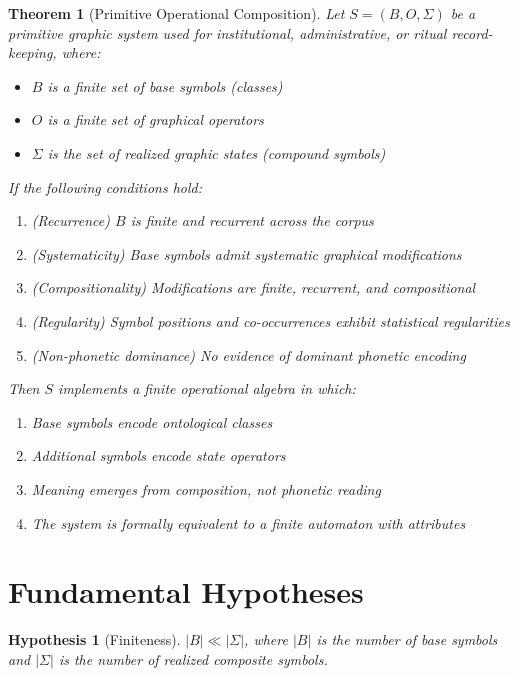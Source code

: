 \documentclass[12pt,a4paper]{article}
\newtheorem{theorem}{Theorem}
\newtheorem{hypothesis}{Hypothesis}
\begin{document}
\begin{theorem}[Primitive Operational Composition]
\label{thm:tcop}
Let $S = (B, O, \Sigma)$ be a primitive graphic system used for institutional, administrative, or ritual record-keeping, where:
\begin{itemize}
    \item $B$ is a finite set of base symbols (classes)
    \item $O$ is a finite set of graphical operators
    \item $\Sigma$ is the set of realized graphic states (compound symbols)
\end{itemize}

If the following conditions hold:
\begin{enumerate}
    \item (Recurrence) $B$ is finite and recurrent across the corpus
    \item (Systematicity) Base symbols admit systematic graphical modifications
    \item (Compositionality) Modifications are finite, recurrent, and compositional
    \item (Regularity) Symbol positions and co-occurrences exhibit statistical regularities
    \item (Non-phonetic dominance) No evidence of dominant phonetic encoding
\end{enumerate}

Then $S$ implements a finite operational algebra in which:
\begin{enumerate}
    \item Base symbols encode ontological classes
    \item Additional symbols encode state operators
    \item Meaning emerges from composition, not phonetic reading
    \item The system is formally equivalent to a finite automaton with attributes
\end{enumerate}
\end{theorem}

\section{Fundamental Hypotheses}

\begin{hypothesis}[Finiteness]
$|B| \ll |\Sigma|$, where $|B|$ is the number of base symbols and $|\Sigma|$ is the number of realized composite symbols.
\end{hypothesis}
\end{document}

